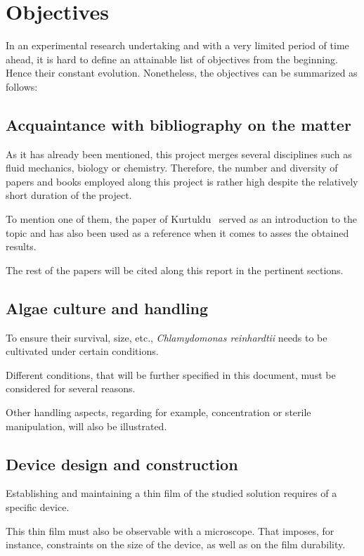 \chapter{Objectives}
\label{objectives}

In an experimental research undertaking and with a very limited period of time ahead, it is hard to define an attainable list of objectives from the beginning.
Hence their constant evolution. Nonetheless, the objectives can be summarized as follows:

\section{Acquaintance with bibliography on the matter}

As it has already been mentioned, this project merges several disciplines such as fluid mechanics, biology or chemistry. Therefore, the number and diversity of papers and books employed along this project is rather high despite the relatively short duration of the project.

To mention one of them, the paper of Kurtuldu~\cite{Kurtuldu2011} served as an introduction to the topic and has also been used as a reference when it comes to asses the obtained results.

The rest of the papers will be cited along this report in the pertinent sections.

\section{Algae culture and handling}

To ensure their survival, size, etc., \textit{Chlamydomonas reinhardtii} needs to be cultivated under certain conditions.

Different conditions, that will be further specified in this document, must be considered for several reasons.

Other handling aspects, regarding for example, concentration or sterile manipulation, will also be illustrated. 

\section{Device design and construction}

Establishing and maintaining a thin film of the studied solution requires of a specific device. 

This thin film must also be observable with a microscope. That imposes, for instance, constraints on the size of the device, as well as on the film durability.

